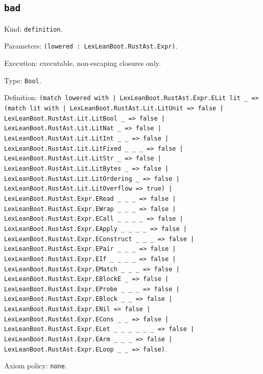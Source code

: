 \documentclass[11pt]{article}
\begin{document}
\subsection*{\texttt{bad}}
\noindent Kind: \texttt{definition}.\par
\noindent Parameters: \texttt{(lowered : LexLeanBoot.RustAst.Expr)}.\par
\noindent Execution: executable, non-escaping closures only.\par
\noindent Type: \texttt{Bool}.\par
\noindent Definition: \texttt{(match lowered with | LexLeanBoot.RustAst.Expr.ELit lit \_ => (match lit with | LexLeanBoot.RustAst.Lit.LitUnit => false | LexLeanBoot.RustAst.Lit.LitBool \_ => false | LexLeanBoot.RustAst.Lit.LitNat \_ => false | LexLeanBoot.RustAst.Lit.LitInt \_ \_ => false | LexLeanBoot.RustAst.Lit.LitFixed \_ \_ \_ => false | LexLeanBoot.RustAst.Lit.LitStr \_ => false | LexLeanBoot.RustAst.Lit.LitBytes \_ => false | LexLeanBoot.RustAst.Lit.LitOrdering \_ => false | LexLeanBoot.RustAst.Lit.LitOverflow => true) | LexLeanBoot.RustAst.Expr.ERead \_ \_ \_ => false | LexLeanBoot.RustAst.Expr.EWrap \_ \_ \_ => false | LexLeanBoot.RustAst.Expr.ECall \_ \_ \_ \_ => false | LexLeanBoot.RustAst.Expr.EApply \_ \_ \_ \_ => false | LexLeanBoot.RustAst.Expr.EConstruct \_ \_ \_ => false | LexLeanBoot.RustAst.Expr.EPair \_ \_ \_ => false | LexLeanBoot.RustAst.Expr.EIf \_ \_ \_ \_ => false | LexLeanBoot.RustAst.Expr.EMatch \_ \_ \_ => false | LexLeanBoot.RustAst.Expr.EBlockE \_ => false | LexLeanBoot.RustAst.Expr.EProbe \_ \_ \_ => false | LexLeanBoot.RustAst.Expr.EBlock \_ \_ => false | LexLeanBoot.RustAst.Expr.ENil => false | LexLeanBoot.RustAst.Expr.ECons \_ \_ => false | LexLeanBoot.RustAst.Expr.ELet \_ \_ \_ \_ \_ \_ => false | LexLeanBoot.RustAst.Expr.EArm \_ \_ \_ => false | LexLeanBoot.RustAst.Expr.ELoop \_ \_ => false)}.\par
\noindent Axiom policy: \texttt{none}.\par
\end{document}
